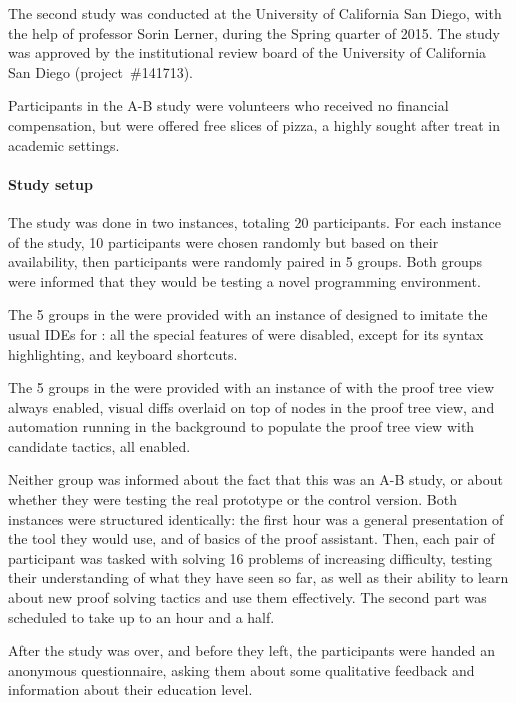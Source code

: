 The second study was conducted at the University of California San Diego, with
the help of professor Sorin Lerner, during the Spring quarter of 2015.  The
study was approved by the institutional review board of the University of
California San Diego (project~\#141713).

Participants in the A-B study were volunteers who received no financial
compensation, but were offered free slices of pizza, a highly sought after treat
in academic settings.

\paragraph{Study setup}

The study was done in two instances, totaling 20 participants.  For each
instance of the study, 10 participants were chosen randomly but based on their
availability, then participants were randomly paired in 5 groups.  Both groups
were informed that they would be testing a novel programming environment.

The 5 groups in the  were provided with an instance of
\PeaCoq{} designed to imitate the usual IDEs for \Coq{}: all the special
features of \PeaCoq{} were disabled, except for its syntax highlighting, and
keyboard shortcuts.

The 5 groups in the  were provided with an instance of
\PeaCoq{} with the proof tree view always enabled, visual diffs overlaid on top
of nodes in the proof tree view, and automation running in the background to
populate the proof tree view with candidate tactics, all enabled.

Neither group was informed about the fact that this was an A-B study, or about
whether they were testing the real prototype or the control version.  Both
instances were structured identically: the first hour was a general presentation
of the tool they would use, and of basics of the \Coq{} proof assistant.  Then,
each pair of participant was tasked with solving 16 problems of increasing
difficulty, testing their understanding of what they have seen so far, as well
as their ability to learn about new proof solving tactics and use them
effectively.  The second part was scheduled to take up to an hour and a half.

After the study was over, and before they left, the participants were handed an
anonymous questionnaire, asking them about some qualitative feedback and
information about their education level.

